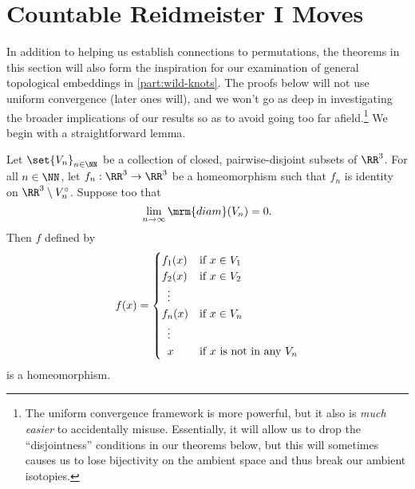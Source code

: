 \section{Countable Reidmeister I
  Moves}\label{sec:countable-r1-moves-for-sn}
In addition to helping us establish connections to permutations, the
theorems in this section will also form the inspiration for our
examination of general topological embeddings in
\cref{part:wild-knots}. The proofs below will not use uniform
convergence (later ones will), and we won't go as deep in
investigating the broader implications of our results so as to avoid
going too far afield.\footnote{The uniform convergence framework is
  more powerful, but it also is \emph{much easier} to accidentally
  misuse. Essentially, it will allow us to drop the ``disjointness''
  conditions in our theorems below, but this will sometimes causes us
  to lose bijectivity on the ambient space and thus break our ambient
  isotopies.} We begin with a straightforward lemma.
\begin{lemma}\label{lem:countable-gluing-homeomorphisms}
  Let $\set{V_n}_{n\in\NN}$ be a collection of closed,
  pairwise-disjoint subsets of $\RR^3$. For all $n \in \NN$, let $f_n
  : \RR^3 \to \RR^3$ be a homeomorphism such that $f_n$ is identity on
  $\RR^3 \setminus V_n^\circ$. Suppose too that%
  \[
    \lim_{n\to\infty} \mrm{diam}(V_n) = 0.
  \]
  Then $f$ defined by
  \[
    f(x) =
    \begin{cases}
      f_1(x) & \text{if } x \in V_1 \\
      f_2(x) & \text{if } x \in V_2 \\
      \hspace{.5em} \vdots & \\
      f_n(x) & \text{if } x \in V_n \\
      \hspace{.5em} \vdots & \\
      \hspace{.5em} x & \text{if $x$ is not in any $V_n$}
    \end{cases}
  \]
  is a homeomorphism.
\end{lemma}
